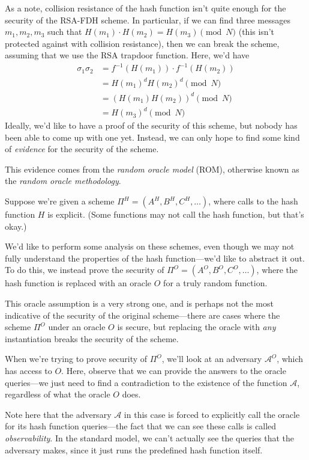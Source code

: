 \documentclass[12pt]{tufte-book}
\begin{document}
As a note, collision resistance of the hash function isn't quite enough for the security of the RSA-FDH scheme. In particular, if we can find three messages $m_1, m_2, m_3$ such that $H(m_1) \cdot H(m_2) = H(m_3) \pmod{N}$ (this isn't protected against with collision resistance), then we can break the scheme, assuming that we use the RSA trapdoor function. Here, we'd have
\begin{align*}
    \sigma_1 \sigma_2 &= f^{-1}(H(m_1)) \cdot f^{-1}(H(m_2)) \\
                      &= H(m_1)^d H(m_2)^d \pmod{N} \\
                      &= (H(m_1) H(m_2))^d \pmod{N} \\
                      &= H(m_3)^d \pmod{N}
\end{align*}
Ideally, we'd like to have a proof of the security of this scheme, but nobody has been able to come up with one yet. Instead, we can only hope to find some kind of \emph{evidence} for the security of the scheme.

This evidence comes from the \emph{random oracle model} (ROM), otherwise known as the \emph{random oracle methodology}.

Suppose we're given a scheme $\Pi^H = (A^H, B^H, C^H, \ldots)$, where calls to the hash function $H$ is explicit. (Some functions may not call the hash function, but that's okay.)

We'd like to perform some analysis on these schemes, even though we may not fully understand the properties of the hash function---we'd like to abstract it out. To do this, we instead prove the security of $\Pi^O = (A^O, B^O, C^O, \ldots)$, where the hash function is replaced with an oracle $O$ for a truly random function.

This oracle assumption is a very strong one, and is perhaps not the most indicative of the security of the original scheme---there are cases where the scheme $\Pi^O$ under an oracle $O$ is secure, but replacing the oracle with \emph{any} instantiation breaks the security of the scheme.

When we're trying to prove security of $\Pi^O$, we'll look at an adversary $\mathcal{A}^O$, which has access to $O$. Here, observe that we can provide the answers to the oracle queries---we just need to find a contradiction to the existence of the function $\mathcal{A}$, regardless of what the oracle $O$ does.

Note here that the adversary $\mathcal{A}$ in this case is forced to explicitly call the oracle for its hash function queries---the fact that we can see these calls is called \emph{observability}. In the standard model, we can't actually see the queries that the adversary makes, since it just runs the predefined hash function itself.
\end{document}
